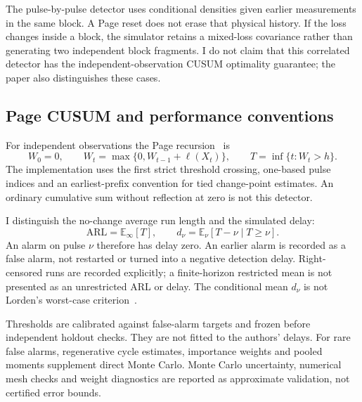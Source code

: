\documentclass[11pt,a4paper]{article}
\newcommand{\ARL}{\mathrm{ARL}}
\begin{document}
The pulse-by-pulse detector uses conditional densities given earlier
measurements in the same block. A Page reset does not erase that physical
history. If the loss changes inside a block, the simulator retains a mixed-loss
covariance rather than generating two independent block fragments.
I do not claim that this correlated detector has the independent-observation
CUSUM optimality guarantee; the paper also distinguishes these cases.

\subsection{Page CUSUM and performance conventions}
For independent observations the Page recursion~\cite{page} is
\begin{equation}
W_0=0,\qquad W_t=\max\{0,W_{t-1}+\ell(X_t)\},\qquad
T=\inf\{t:W_t>h\}.
\end{equation}
The implementation uses the first strict threshold crossing, one-based pulse
indices and an earliest-prefix convention for tied change-point estimates.
An ordinary cumulative sum without reflection at zero is not this detector.

I distinguish the no-change average run length and the simulated delay:
\begin{equation}
\ARL=\mathbb E_\infty[T],\qquad
d_\nu=\mathbb E_\nu[T-\nu\mid T\geq\nu].
\end{equation}
An alarm on pulse $\nu$ therefore has delay zero. An earlier alarm is recorded
as a false alarm, not restarted or turned into a negative detection delay.
Right-censored runs are recorded explicitly; a finite-horizon restricted mean
is not presented as an unrestricted ARL or delay. The conditional mean $d_\nu$
is not Lorden's worst-case criterion~\cite{lorden}.

Thresholds are calibrated against false-alarm targets and frozen before
independent holdout checks. They are not fitted to the authors' delays.
For rare false alarms, regenerative cycle estimates, importance weights and
pooled moments supplement direct Monte Carlo. Monte Carlo uncertainty,
numerical mesh checks and weight diagnostics are reported as approximate
validation, not certified error bounds.
\end{document}
